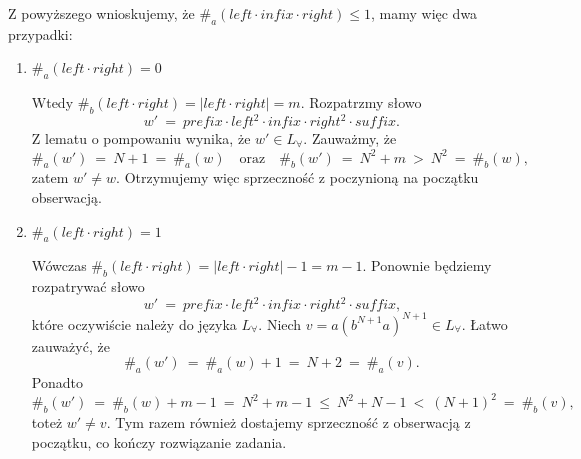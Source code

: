 \documentclass[12pt]{article}
\begin{document}
	\medskip
	
	Z powyższego wnioskujemy, że
	\(\#_{a} \left( left \cdot infix \cdot right \right) \leqslant 1\), mamy
	więc dwa przypadki:
	\begin{enumerate}
		\item \(\#_{a} \left( left \cdot right \right) = 0\)
		      
		      Wtedy \(\#_{b} \left( left \cdot right \right) = \left| left \cdot
		      right \right| = m\). Rozpatrzmy słowo
		      \[ w' \ = \ prefix \cdot left^{2} \cdot infix \cdot right^{2}
		      \cdot suffix \text{.} \]
		      Z lematu o pompowaniu wynika, że \(w' \in L_{\forall}\). Zauważmy,
		      że
		      \[ \#_{a} \left( w' \right) \ = \ N + 1 \ = \ \#_{a} \left( w
		      \right) \quad \text{oraz} \quad \#_{b} \left( w' \right) \ = \
		      N^{2} + m \ > \ N^{2} \ = \ \#_{b} \left( w \right) \text{,} \]
		      zatem \(w' \neq w\). Otrzymujemy więc sprzeczność z poczynioną
		      na początku obserwacją.
		
		\item \(\#_{a} \left( left \cdot right \right) = 1\)
		      
		      Wówczas \(\#_{b} \left( left \cdot right \right) = \left| left
		      \cdot right \right| - 1 = m - 1\). Ponownie będziemy rozpatrywać
		      słowo
		      \[ w' \ = \ prefix \cdot left^{2} \cdot infix \cdot right^{2}
		      \cdot suffix \text{,} \]
		      które oczywiście należy do języka \(L_{\forall}\). Niech \(v = a
		      \left( b^{N + 1} a \right) ^ {N + 1} \in L_{\forall}\). Łatwo
		      zauważyć, że
		      \[ \#_{a} \left( w' \right) \ = \ \#_{a} \left( w \right) + 1 \ =
		      \ N + 2 \ = \ \#_{a} \left( v \right) \text{.} \]
		      Ponadto
		      \[ \#_{b} \left( w' \right) \ = \ \#_{b} \left( w \right) + m - 1
		      \ = \ N^{2} + m - 1 \ \leqslant \ N^2 + N - 1 \ < \ \left( N + 1
		      \right) ^ {2} \ = \ \#_{b} \left( v \right) \text{,} \]
		      toteż \(w' \neq v\). Tym razem również dostajemy sprzeczność z
		      obserwacją z początku, co kończy rozwiązanie zadania.
	\end{enumerate}
\end{document}
